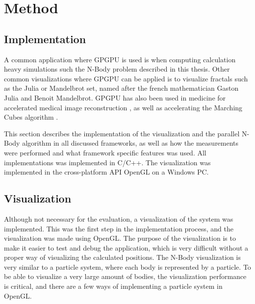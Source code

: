 
\chapter{Method}

\section{Implementation}
A common application where GPGPU is used is when computing calculation heavy simulations such the N-Body problem described in this thesis. Other common visualizations where GPGPU can be applied is to visualize fractals such as the Julia or Mandelbrot set, named after the french mathematician Gaston Julia and Benoit Mandelbrot. GPGPU has also been used in medicine for accelerated medical image reconstruction \cite{archirapatkave2011gpgpu}, as well as accelerating the Marching Cubes algorithm \cite{johansson2006accelerating}. 

This section describes the implementation of the visualization and the parallel N-Body algorithm in all discussed frameworks, as well as how the measurements were performed and what framework specific features was used. All implementations was implemented in C/C++. The visualization was implemented in the cross-platform API OpenGL on a Windows PC.

\section{Visualization} \label{sec:visualization}

Although not necessary for the evaluation, a visualization of the system was implemented. This was the first step in the implementation process, and the visualization was made using OpenGL. The purpose of the visualization is to make it easier to test and debug the application, which is very difficult without a proper way of visualizing the calculated positions. The N-Body visualization is very similar to a particle system, where each body is represented by a particle. To be able to visualize a very large amount of bodies, the visualization performance is critical, and there are a few ways of implementing a particle system in OpenGL.


